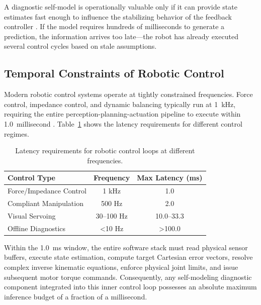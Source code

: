 \documentclass[12pt,a4paper,oneside]{report}
\begin{document}
A diagnostic self-model is operationally valuable only if it can provide state estimates fast enough to influence the stabilizing behavior of the feedback controller \cite{hu2024teaching, hu2025learning}. If the model requires hundreds of milliseconds to generate a prediction, the information arrives too late---the robot has already executed several control cycles based on stale assumptions.
\subsection{Temporal Constraints of Robotic Control}
\label{subsec:temporal_constraints}

Modern robotic control systems operate at tightly constrained frequencies. Force control, impedance control, and dynamic balancing typically run at 1~kHz, requiring the entire perception-planning-actuation pipeline to execute within 1.0~millisecond \cite{siciliano2009robotics}. Table~\ref{tab:control_loop_latency} shows the latency requirements for different control regimes.
\begin{table}[H]
\centering

\caption{Latency requirements for robotic control loops at different frequencies.}
\label{tab:control_loop_latency}
\begin{tabular}{lcc}
\toprule

\textbf{Control Type} & \textbf{Frequency} & \textbf{Max Latency (ms)} \\
\midrule

Force/Impedance Control & 1 kHz & 1.0 \\

Compliant Manipulation & 500 Hz & 2.0 \\

Visual Servoing & 30--100 Hz & 10.0--33.3 \\

Offline Diagnostics & <10 Hz & >100.0 \\
\bottomrule

\end{tabular}
\end{table}

Within the 1.0~ms window, the entire software stack must read physical sensor buffers, execute state estimation, compute target Cartesian error vectors, resolve complex inverse kinematic equations, enforce physical joint limits, and issue subsequent motor torque commands. Consequently, any self-modeling diagnostic component integrated into this inner control loop possesses an absolute maximum inference budget of a fraction of a millisecond.
\end{document}
